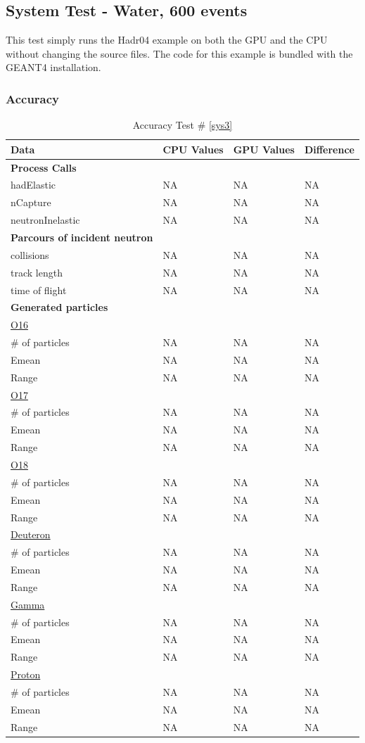 \documentclass[12pt]{article}
\begin{document}
\subsection{System Test - Water, 600 events}
This test simply runs the Hadr04 example on both the GPU and the CPU without changing the source files. The code for this example is bundled with the GEANT4 installation.\\
\break
	\subsubsection{Accuracy}
		\begin{table}[!htbp]
		\centering
		\caption{Accuracy Test \# \ref{sys3}}\label{_acc}
		\begin{tabular}{llll}
		\toprule
		\bf Data & CPU Values & GPU Values & Difference\\\midrule
		\bf Process Calls&&&\\
		hadElastic&NA&NA&NA\\
		nCapture&NA&NA&NA\\
		neutronInelastic&NA&NA&NA\\ 
		\bf Parcours of incident neutron&&&\\
		collisions&NA&NA&NA\\
		track length&NA&NA&NA\\
		time of flight&NA&NA&NA\\
		\bf Generated particles&&&\\
		\underline{O16}&&&\\
		\# of particles&NA&NA&NA\\
		Emean&NA&NA&NA\\
		Range&NA&NA&NA\\
		\underline{O17}&&&\\
		\# of particles&NA&NA&NA\\
		Emean&NA&NA&NA\\
		Range&NA&NA&NA\\
		\underline{O18}&&&\\
		\# of particles&NA&NA&NA\\
		Emean&NA&NA&NA\\
		Range&NA&NA&NA\\
		\underline{Deuteron}&&&\\
		\# of particles&NA&NA&NA\\
		Emean&NA&NA&NA\\
		Range&NA&NA&NA\\
		\underline{Gamma}&&&\\
		\# of particles&NA&NA&NA\\
		Emean&NA&NA&NA\\
		Range&NA&NA&NA\\
		\underline{Proton}&&&\\
		\# of particles&NA&NA&NA\\
		Emean&NA&NA&NA\\
		Range&NA&NA&NA\\
		\end{tabular}
		\end{table}
		\break
\end{document}
